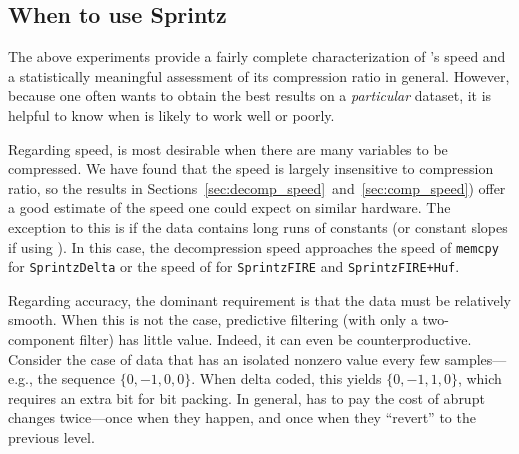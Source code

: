 \subsection{When to use Sprintz}


The above experiments provide a fairly complete characterization of \mine's speed and a statistically meaningful assessment of its compression ratio in general. However, because one often wants to obtain the best results on a \textit{particular} dataset, it is helpful to know when \minesp is likely to work well or poorly.

Regarding speed, \minesp is most desirable when there are many variables to be compressed. We have found that the speed is largely insensitive to compression ratio, so the results in Sections~\ref{sec:decomp_speed}~and~\ref{sec:comp_speed}) offer a good estimate of the speed one could expect on similar hardware. The exception to this is if the data contains long runs of constants (or constant slopes if using \fire). In this case, the decompression speed approaches the speed of \texttt{memcpy} for \texttt{SprintzDelta} or the speed of \fire for \texttt{SprintzFIRE} and \texttt{SprintzFIRE+Huf}.


Regarding accuracy, the dominant requirement is that the data must be relatively smooth. When this is not the case, predictive filtering (with only a two-component filter) has little value. Indeed, it can even be counterproductive. Consider the case of data that has an isolated nonzero value every few samples---e.g., the sequence $\{0, -1, 0, 0\}$. When delta coded, this yields $\{0, -1, 1, 0\}$, which requires an extra bit for \minesp bit packing. In general, \minesp has to pay the cost of abrupt changes twice---once when they happen, and once when they ``revert'' to the previous level.

